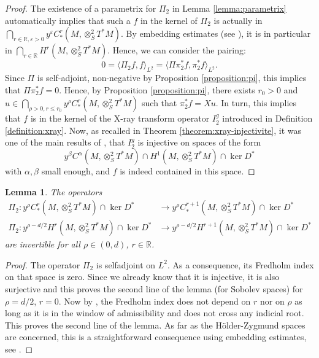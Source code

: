\documentclass[10pt]{amsart}
\newcommand{\R}{\mathbb{R}}
\newcommand{\eps}{\varepsilon}
\theoremstyle{plain}
\newtheorem{lemma}{Lemma}[section]
\theoremstyle{definition}
\begin{document}
\begin{proof}
The existence of a parametrix for $\Pi_2$ in Lemma \ref{lemma:parametrix} automatically implies that such a $f$ in the kernel of $\Pi_2$ is actually in $\bigcap_{r \in \R, \eps > 0} y^\eps C^r_*(M,\otimes^2_S T^*M)$. By embedding estimates (see \cite[Lem.\,2.1]{Bonthonneau-Lefeuvre-19-1}), it is in particular in $\bigcap_{r \in \R} H^r(M,\otimes^2_S T^*M)$. Hence, we can consider the pairing:
\[
0 = \langle \Pi_2f ,f \rangle_{L^2} = \langle \Pi \pi_2^*f, \pi_2^*f \rangle_{L^2}.
\]
Since $\Pi$ is self-adjoint, non-negative by Proposition \ref{proposition:pi}, this implies that $\Pi \pi_2^*f = 0$. Hence, by Proposition \ref{proposition:pi}, there exists $r_0>0$ and $u\in \bigcap_{\rho>0,r\leq r_0}y^\rho C^r_*(M,\otimes^2_S T^*M)$ such that $\pi_2^*f = Xu$. In turn, this implies that $f$ is in the kernel of the X-ray transform operator $I_2^g$ introduced in Definition \ref{definition:xray}. Now, as recalled in Theorem \ref{theorem:xray-injectivite}, it was one of the main results of \cite[Th.\,1]{Bonthonneau-Lefeuvre-19-1}, that $I_2^g$ is injective on spaces of the form
\[
y^\beta C^\alpha(M, \otimes^2_S T^*M) \cap H^1(M, \otimes^2_S T^*M) \cap \ker D^*
\]
with $\alpha, \beta$ small enough, and $f$ is indeed contained in this space.
\end{proof}

\begin{lemma}
The operators
\[
\begin{split}
\Pi_2 : y^\rho C^r_*(M,\otimes^2_S T^*M) \cap \ker D^* &\to y^\rho C^{r+1}_*(M,\otimes^2_S T^*M) \cap \ker D^*\\
\Pi_2 : y^{\rho-d/2} H^r(M,\otimes^2_S T^*M) \cap \ker D^* &\to y^{\rho-d/2} H^{r+1}(M,\otimes^2_S T^*M) \cap \ker D^*
\end{split}
\]
are invertible for all $\rho \in (0,d)$, $r \in \R$.
\end{lemma}

\begin{proof}
The operator $\Pi_2$ is selfadjoint on $L^2$. As a consequence, its Fredholm index on that space is zero. Since we already know that it is injective, it is also surjective and this proves the second line of the lemma (\ie for Sobolev spaces) for $\rho=d/2$, $r = 0$. Now by \cite[Prop.\,4.6]{Bonthonneau-Lefeuvre-19-1}, the Fredholm index does not depend on $r$ nor on $\rho$ as long as it is in the window of admissibility and does not cross any indicial root. This proves the second line of the lemma. As far as the Hölder-Zygmund spaces are concerned, this is a straightforward consequence using embedding estimates, see \cite[Prop.\,4.9]{Bonthonneau-Lefeuvre-19-1}.
\end{proof}
\end{document}
